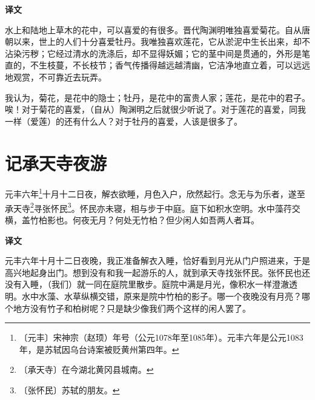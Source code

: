 \documentclass[12pt,UTF-8,openany,a4]{ctexbook}
\begin{document}
\newpage

\begin{Large}
    \noindent\textbf{译文}
\end{Large}


\vspace{1em}

\begin{large}
    \yiwen 
    水上和陆地上草木的花中，可以喜爱的有很多。晋代陶渊明唯独喜爱菊花。自从唐朝以来，世上的人们十分喜爱牡丹。我唯独喜欢莲花，它从淤泥中生长出来，却不沾染污秽；它经过清水的洗涤后，却不显得妖媚；它的茎中间是贯通的，外形是笔直的，不生枝蔓，不长枝节；香气传播得越远越清幽，它洁净地直立着，可以远远地观赏，不可靠近去玩弄。
    
    我认为，菊花，是花中的隐士；牡丹，是花中的富贵人家；莲花，是花中的君子。唉！对于菊花的喜爱，（自从）陶渊明之后就很少听说了。对于莲花的喜爱，同我一样（爱莲）的还有什么人？对于牡丹的喜爱，人该是很多了。
    
\end{large}



\chapter{记承天寺夜游}

\begin{large}
    
    元丰六年\footnote{〔元丰〕\yiwen 宋神宗（赵顼）年号（公元1078年至1085年）。元丰六年是公元1083年，是苏轼因乌台诗案被贬黄州第四年。}十月十二日夜，解衣欲睡，月色入户，欣然起行。念无与为乐者，遂至承天寺\footnote{〔承天寺〕\yiwen 在今湖北黄冈县城南。}寻张怀民\footnote{〔张怀民〕\yiwen 苏轼的朋友。}。怀民亦未寝，相与步于中庭。庭下如积水空明。水中藻荇交横，盖竹柏影也。何夜无月？何处无竹柏？但少闲人如吾两人者耳。
\end{large}


\newpage

\begin{Large}
    \noindent\textbf{译文}
\end{Large}


\vspace{1em}

\begin{large}
    \yiwen 
    元丰六年十月十二日夜晚，我正准备解衣入睡，恰好看到月光从门户照进来，于是高兴地起身出门。想到没有和我一起游乐的人，就到承天寺找张怀民。张怀民也还没有入睡，（我们）就一同在庭院里散步。庭院中满是月光，像积水一样澄澈透明。水中水藻、水草纵横交错，原来是院中竹柏的影子。哪一个夜晚没有月亮？哪个地方没有竹子和柏树呢？只是缺少像我们两个这样的闲人罢了。
    
\end{large}
\end{document}
